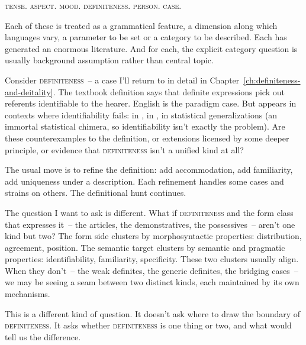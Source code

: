 \textsc{tense}. \textsc{aspect}. \textsc{mood}. \textsc{definiteness}. \textsc{person}. \textsc{case}.

Each of these is treated as a grammatical feature, a dimension along which languages vary, a parameter to be set or a category to be described. Each has generated an enormous literature. And for each, the explicit category question is usually background assumption rather than central topic.

Consider \textsc{definiteness}~-- a case I'll return to in detail in Chapter~\ref{ch:definiteness-and-deitality}. The textbook definition says that definite expressions pick out referents identifiable to the hearer. English  is the paradigm case. But  appears in contexts where identifiability fails:  in ,  in ,  in statistical generalizations (an immortal statistical chimera, so identifiability isn't exactly the problem). Are these counterexamples to the definition, or extensions licensed by some deeper principle, or evidence that \textsc{definiteness} isn't a unified kind at all?

The usual move is to refine the definition: add accommodation, add familiarity, add uniqueness under a description. Each refinement handles some cases and strains on others. The definitional hunt continues.

The question I want to ask is different. What if \textsc{definiteness} and the form class that expresses it~-- the articles, the demonstratives, the possessives~-- aren't one kind but two? The form side clusters by morphosyntactic properties: distribution, agreement, position. The semantic target clusters by semantic and pragmatic properties: identifiability, familiarity, specificity. These two clusters usually align. When they don't~-- the weak definites, the generic definites, the bridging cases~-- we may be seeing a seam between two distinct kinds, each maintained by its own mechanisms.

This is a different kind of question. It doesn't ask where to draw the boundary of \textsc{definiteness}. It asks whether \textsc{definiteness} is one thing or two, and what would tell us the difference.

